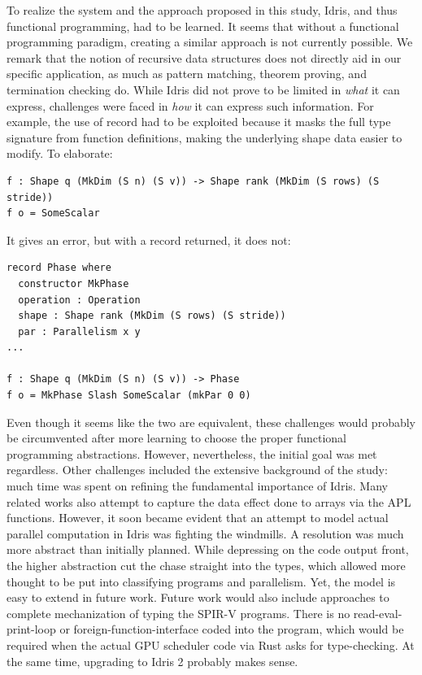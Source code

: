 \documentclass{report}
\begin{document}
To realize the system and the approach proposed in this study, Idris, and thus functional programming, had to be learned. It seems that without a functional programming paradigm, creating a similar approach is not currently possible. We remark that the notion of recursive data structures does not directly aid in our specific application, as much as pattern matching, theorem proving, and termination checking do. While Idris did not prove to be limited in \emph{what} it can express, challenges were faced in \emph{how} it can express such information. For example, the use of record had to be exploited because it masks the full type signature from function definitions, making the underlying shape data easier to modify. To elaborate:

\begin{verbatim}
f : Shape q (MkDim (S n) (S v)) -> Shape rank (MkDim (S rows) (S stride))
f o = SomeScalar
\end{verbatim}

It gives an error, but with a record returned, it does not:

\begin{verbatim}
record Phase where
  constructor MkPhase
  operation : Operation
  shape : Shape rank (MkDim (S rows) (S stride))
  par : Parallelism x y
...

f : Shape q (MkDim (S n) (S v)) -> Phase
f o = MkPhase Slash SomeScalar (mkPar 0 0)  
\end{verbatim}

Even though it seems like the two are equivalent, these challenges would probably be circumvented after more learning to choose the proper functional programming abstractions. However, nevertheless, the initial goal was met regardless. Other challenges included the extensive background of the study: much time was spent on refining the fundamental importance of Idris. Many related works also attempt to capture the data effect done to arrays via the APL functions. However, it soon became evident that an attempt to model actual parallel computation in Idris was fighting the windmills. A resolution was much more abstract than initially planned. While depressing on the code output front, the higher abstraction cut the chase straight into the types, which allowed more thought to be put into classifying programs and parallelism. Yet, the model is easy to extend in future work. Future work would also include approaches to complete mechanization of typing the SPIR-V programs. There is no read-eval-print-loop or foreign-function-interface coded into the program, which would be required when the actual GPU scheduler code via Rust asks for type-checking. At the same time, upgrading to Idris 2 probably makes sense.
\end{document}
